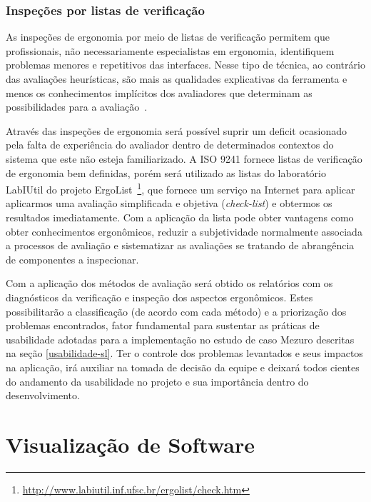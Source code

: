 \subsubsection{Inspeções por listas de verificação}
\label{inspeções-listas}
As inspeções de ergonomia por meio de listas de verificação permitem que
profissionais, não necessariamente especialistas em ergonomia, identifiquem
problemas menores e repetitivos das interfaces.
%
Nesse tipo de técnica, ao contrário das avaliações heurísticas, são mais as
qualidades explicativas da ferramenta e menos os conhecimentos implícitos dos
avaliadores que determinam as possibilidades para a avaliação~\cite{cybis2010}.

%
Através das inspeções de ergonomia será possível suprir um deficit ocasionado
pela falta de experiência do avaliador dentro de determinados contextos do
sistema que este não esteja familiarizado.
%
A ISO 9241 fornece listas de verificação de ergonomia bem definidas, porém será
utilizado as listas do laboratório LabIUtil do projeto
ErgoList~\footnote{\url{http://www.labiutil.inf.ufsc.br/ergolist/check.htm}},
que fornece um serviço na Internet para aplicar aplicarmos uma avaliação
simplificada e objetiva (\textit{check-list}) e obtermos os resultados
imediatamente.
%
Com a aplicação da lista pode obter vantagens como obter conhecimentos
ergonômicos, reduzir a subjetividade normalmente associada a processos de
avaliação e sistematizar as avaliações se tratando de abrangência de componentes
a inspecionar.

Com a aplicação dos métodos de avaliação será obtido os relatórios com os diagnósticos da verificação e inspeção dos aspectos ergonômicos. Estes possibilitarão a classificação (de acordo com cada método) e a priorização dos problemas encontrados, fator fundamental para sustentar as práticas de usabilidade adotadas para a implementação no estudo de caso Mezuro descritas na seção \ref{usabilidade-sl}. Ter o controle dos problemas levantados e seus impactos na aplicação, irá auxiliar na tomada de decisão da equipe e deixará todos cientes do andamento da usabilidade no projeto e sua importância dentro do desenvolvimento. 

\section{Visualização de Software}


